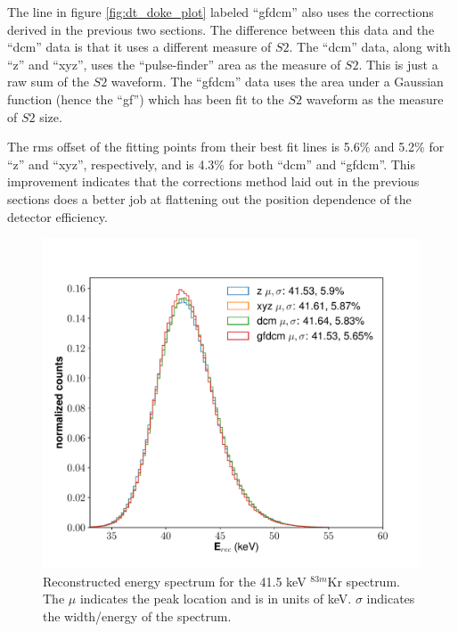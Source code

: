 {The line in figure \ref{fig:dt_doke_plot} labeled ``gfdcm'' also uses the corrections derived in the previous two sections. The difference between this data and the ``dcm'' data is that it uses a different measure of $S2$. The ``dcm'' data, along with ``z'' and ``xyz'', uses the ``pulse-finder'' area as the measure of $S2$. This is just a raw sum of the $S2$ waveform. The ``gfdcm'' data uses the area under a Gaussian function (hence the ``gf'') which has been fit to the $S2$ waveform as the measure of $S2$ size. 

The rms offset of the fitting points from their best fit lines is 5.6\% and 5.2\% for ``z'' and ``xyz'', respectively, and is 4.3\% for both ``dcm'' and ``gfdcm''. This improvement indicates that the corrections method laid out in the previous sections does a better job at flattening out the position dependence of the detector efficiency.
\begin{figure}[h!]
  \centering
  \includegraphics[width=\textwidth]{Figures/E_spec_Kr.pdf}
  \caption{Reconstructed energy spectrum for the 41.5 keV $^{83m}$Kr spectrum. The $\mu$ indicates the peak location and is in units of keV. $\sigma$ indicates the width/energy of the spectrum.}
\label{fig:E_spec_Kr} 
\end{figure}

}
